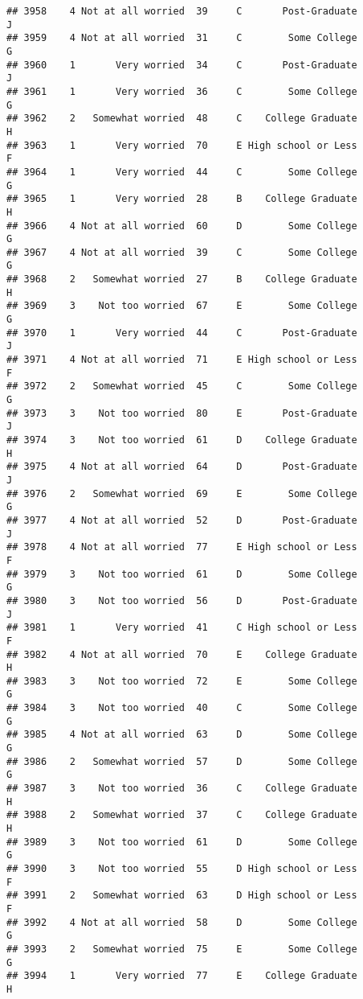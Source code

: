 \documentclass[
]{article}
\begin{document}
\begin{verbatim}
## 3958    4 Not at all worried  39     C       Post-Graduate         J
## 3959    4 Not at all worried  31     C        Some College         G
## 3960    1       Very worried  34     C       Post-Graduate         J
## 3961    1       Very worried  36     C        Some College         G
## 3962    2   Somewhat worried  48     C    College Graduate         H
## 3963    1       Very worried  70     E High school or Less         F
## 3964    1       Very worried  44     C        Some College         G
## 3965    1       Very worried  28     B    College Graduate         H
## 3966    4 Not at all worried  60     D        Some College         G
## 3967    4 Not at all worried  39     C        Some College         G
## 3968    2   Somewhat worried  27     B    College Graduate         H
## 3969    3    Not too worried  67     E        Some College         G
## 3970    1       Very worried  44     C       Post-Graduate         J
## 3971    4 Not at all worried  71     E High school or Less         F
## 3972    2   Somewhat worried  45     C        Some College         G
## 3973    3    Not too worried  80     E       Post-Graduate         J
## 3974    3    Not too worried  61     D    College Graduate         H
## 3975    4 Not at all worried  64     D       Post-Graduate         J
## 3976    2   Somewhat worried  69     E        Some College         G
## 3977    4 Not at all worried  52     D       Post-Graduate         J
## 3978    4 Not at all worried  77     E High school or Less         F
## 3979    3    Not too worried  61     D        Some College         G
## 3980    3    Not too worried  56     D       Post-Graduate         J
## 3981    1       Very worried  41     C High school or Less         F
## 3982    4 Not at all worried  70     E    College Graduate         H
## 3983    3    Not too worried  72     E        Some College         G
## 3984    3    Not too worried  40     C        Some College         G
## 3985    4 Not at all worried  63     D        Some College         G
## 3986    2   Somewhat worried  57     D        Some College         G
## 3987    3    Not too worried  36     C    College Graduate         H
## 3988    2   Somewhat worried  37     C    College Graduate         H
## 3989    3    Not too worried  61     D        Some College         G
## 3990    3    Not too worried  55     D High school or Less         F
## 3991    2   Somewhat worried  63     D High school or Less         F
## 3992    4 Not at all worried  58     D        Some College         G
## 3993    2   Somewhat worried  75     E        Some College         G
## 3994    1       Very worried  77     E    College Graduate         H

\end{verbatim}
\end{document}
